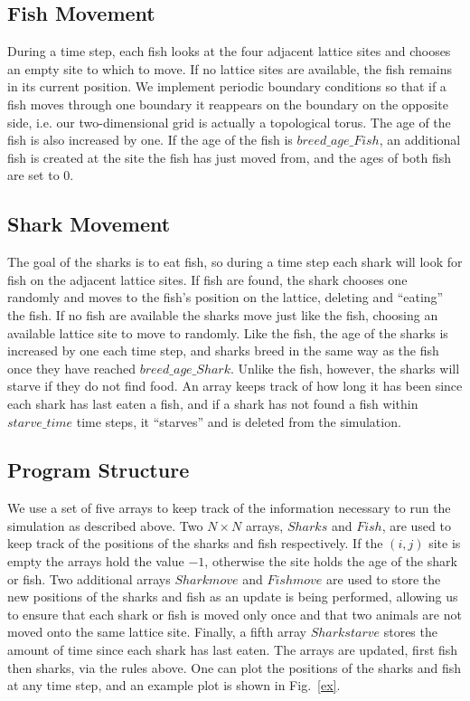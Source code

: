 \documentclass[aps,prl,preprint,superscriptaddress]{revtex4}
\begin{document}
\subsection{Fish Movement}
During a time step, each fish looks at the four adjacent lattice sites and chooses an empty site to which to move. If no lattice sites are available, the fish remains in its current position. We implement periodic boundary conditions so that if a fish moves through one boundary it reappears on the boundary on the opposite side, i.e. our two-dimensional grid is actually a topological torus. The age of the fish is also increased by one. If the age of the fish is $breed\_age\_Fish$, an additional fish is created at the site the fish has just moved from, and the ages of both fish are set to 0.

\subsection{Shark Movement}
The goal of the sharks is to eat fish, so during a time step each shark will look for fish on the adjacent lattice sites. If fish are found, the shark chooses one randomly and moves to the fish's position on the lattice, deleting and ``eating'' the fish. If no fish are available the sharks move just like the fish, choosing an available lattice site to move to randomly. Like the fish, the age of the sharks is increased by one each time step, and sharks breed in the same way as the fish once they have reached $breed\_age\_Shark$. Unlike the fish, however, the sharks will starve if they do not find food. An array keeps track of how long it has been since each shark has last eaten a fish, and if a shark has not found a fish within $starve\_time$ time steps, it ``starves'' and is deleted from the simulation.

\subsection{Program Structure}
We use a set of five arrays to keep track of the information necessary to run the simulation as described above. Two $N \times N$ arrays, $Sharks$ and $Fish$, are used to keep track of the positions of the sharks and fish respectively. If the $(i,j)$ site is empty the arrays hold the value $-1$, otherwise the site holds the age of the shark or fish. Two additional arrays $Sharkmove$ and $Fishmove$ are used to store the new positions of the sharks and fish as an update is being performed, allowing us to ensure that each shark or fish is moved only once and that two animals are not moved onto the same lattice site. Finally, a fifth array $Sharkstarve$ stores the amount of time since each shark has last eaten. The arrays are updated, first fish then sharks, via the rules above. One can plot the positions of the sharks and fish at any time step, and an example plot is shown in Fig.~\ref{ex}.
\end{document}
